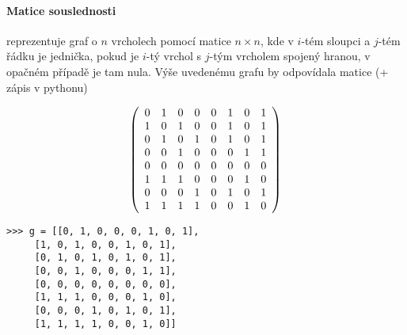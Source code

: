 \paragraph{Matice souslednosti} reprezentuje graf o $n$ vrcholech pomocí matice $n\times n$, kde v $i$-tém sloupci a $j$-tém řádku je jednička, pokud
je $i$-tý vrchol s $j$-tým vrcholem spojený hranou, v opačném případě je tam nula. Výše uvedenému grafu by odpovídala matice (+ zápis v pythonu)
\begin{center}
\begin{minipage}{3.5cm}
$$
\left(
\begin{array}{cccccccc}
0 & 1 & 0 & 0 & 0 & 1 & 0 & 1\cr
1 & 0 & 1 & 0 & 0 & 1 & 0 & 1\cr
0 & 1 & 0 & 1 & 0 & 1 & 0 & 1\cr
0 & 0 & 1 & 0 & 0 & 0 & 1 & 1\cr
0 & 0 & 0 & 0 & 0 & 0 & 0 & 0\cr
1 & 1 & 1 & 0 & 0 & 0 & 1 & 0\cr
0 & 0 & 0 & 1 & 0 & 1 & 0 & 1\cr
1 & 1 & 1 & 1 & 0 & 0 & 1 & 0\cr
\end{array}
\right)
$$
\end{minipage}
\hskip2cm
\begin{minipage}{7cm}
\begin{verbatim}
>>> g = [[0, 1, 0, 0, 0, 1, 0, 1],
	 [1, 0, 1, 0, 0, 1, 0, 1],
	 [0, 1, 0, 1, 0, 1, 0, 1],
	 [0, 0, 1, 0, 0, 0, 1, 1],
	 [0, 0, 0, 0, 0, 0, 0, 0],
	 [1, 1, 1, 0, 0, 0, 1, 0],
	 [0, 0, 0, 1, 0, 1, 0, 1],
	 [1, 1, 1, 1, 0, 0, 1, 0]]
\end{verbatim}
\end{minipage}
\end{center}

